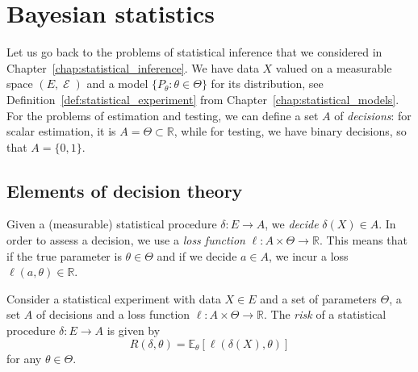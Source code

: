 \documentclass[
	fontsize=11pt, %
	twoside=false, %
	numbers=noenddot, %
]{kaobook}
\DeclareMathOperator{\cE}{{\mathcal E}}
\newcommand{\E}{\mathbb E}
\newcommand{\R}{\mathbb R}
\newcommand{\go}{\rightarrow}
\begin{document}
\mainmatter %








% 


\setchapterpreamble[u]{\margintoc}
\chapter{Bayesian statistics}
\label{chap:bayesian_statistics}

Let us go back to the problems of statistical inference that we considered in Chapter~\ref{chap:statistical_inference}.
We have data $X$ valued on a measurable space $(E, \cE)$ and a model $\{ P_\theta : \theta \in \Theta\}$ for its distribution, see Definition~\ref{def:statistical_experiment} from Chapter~\ref{chap:statistical_models}.
For the problems of estimation and testing, we can define a set $A$ of \emph{decisions}: for scalar estimation, it is $A = \Theta \subset \R$, while for testing, we have binary decisions, so that $A = \{ 0, 1 \}$.

\section{Elements of decision theory} %
\label{sec:elements_of_decision_theory}

Given a (measurable) statistical procedure $\delta : E \go A$, we \emph{decide} $\delta(X) \in A$.
In order to assess a decision, we use a \emph{loss function} $\ell : A \times \Theta \go \R$.
This means that if the true parameter is $\theta \in \Theta$ and if we decide $a \in A$, we incur a loss $\ell(a, \theta) \in \R$.

\begin{definition}
	Consider a statistical experiment with data $X \in E$ and a set of parameters $\Theta$, a set $A$ of decisions and a loss function $\ell : A \times \Theta \go \R$. The \emph{risk} of a statistical procedure $\delta : E \go A$ is given by
	\begin{equation*}
		R(\delta, \theta) = \E_\theta[ \ell(\delta(X), \theta)]
	\end{equation*}
	for any $\theta \in \Theta$.
\end{definition}
\end{document}
